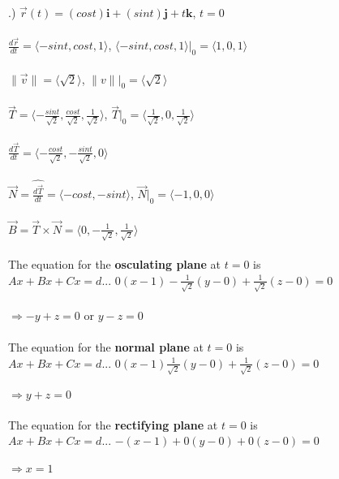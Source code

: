 \documentclass[12pt]{article}
\begin{document}
.) $\vec{r}(t) = (cos{t})\mathbf{i} + (sin{t})\mathbf{j} + t\mathbf{k}$, \hspace{10pt} $t = 0$\\\\
\noindent $\frac{d\vec{r}}{dt} = \langle -sin{t}, cos{t}, 1\rangle$,
 \hspace{10pt} $\langle -sin{t}, cos{t}, 1\rangle \Big|_{0} = \langle 1, 0, 1\rangle$\\\\
\noindent $\| \vec{v} \| = \langle \sqrt{2}\rangle$, \hspace{10pt} $\| v \| \Big|_{0} = \langle \sqrt{2} \rangle$\\\\
\noindent $\vec{T} = \langle -\frac{sin{t}}{\sqrt{2}}, \frac{cos{t}}{\sqrt{2}}, \frac{1}{\sqrt{2}}\rangle$,
 \hspace{10pt} $\vec{T}\Big|_{0} = \langle \frac{1}{\sqrt{2}}, 0, \frac{1}{\sqrt{2}}\rangle$\\\\
\noindent $\frac{d\vec{T}}{dt} = \langle -\frac{cos{t}}{\sqrt{2}}, -\frac{sin{t}}{\sqrt{2}}, 0 \rangle$\\\\
\noindent $\vec{N} = \hat{\frac{d\vec{T}}{dt}} = \langle -cos{t}, -sin{t}\rangle$, \hspace{10pt}
 $\vec{N}\Big|_{0} = \langle -1, 0, 0\rangle$\\\\
\noindent $\vec{B} = \vec{T} \times \vec{N} = \langle 0, -\frac{1}{\sqrt{2}}, \frac{1}{\sqrt{2}}\rangle$\\\\
\noindent The equation for the \textbf{osculating plane} at $t = 0$ is \\$Ax + Bx + Cx  = d$...
$0(x - 1) - \frac{1}{\sqrt{2}}(y - 0) + \frac{1}{\sqrt{2}} (z - 0) = 0$\\\\
\noindent $\Rightarrow -y+z = 0$ or $y - z = 0$\\\\ 
\noindent The equation for the \textbf{normal plane} at $t = 0$ is \\$ Ax + Bx + Cx  = d$...
$0(x - 1)  \frac{1}{\sqrt{2}}(y - 0) + \frac{1}{\sqrt{2}} (z - 0) = 0$\\\\
\noindent $\Rightarrow y+z = 0$\\\\ 
\noindent The equation for the \textbf{rectifying plane} at $t = 0$ is \\$ Ax + Bx + Cx  = d$...
$-(x - 1) + 0(y - 0) + 0(z - 0) = 0$\\\\
\noindent $\Rightarrow x = 1$\\\\ 
\end{document}

